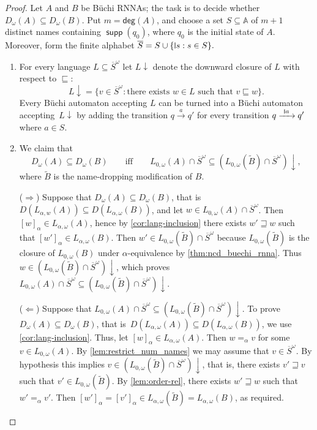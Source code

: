 \documentclass[10pt,a4paper]{amsart}
\newcommand{\midmid}{\hspace{0.2ex}{\rule[-0.1ex]{0.6pt}{1.65ex}}\hspace{0.2ex}}
\newcommand{\scriptmidmid}{\hspace{0.2ex}{\rule[-0.1ex]{0.6pt}{1.1ex}}\hspace{0.2ex}}
\newcommand{\compr}{:}
\newcommand{\newletter}[1]{{\midmid}#1}
\newcommand{\scriptnew}[1]{{\scriptmidmid}#1}
\newcommand{\degree}{\mathsf{deg}}
\numberwithin{equation}{section}
\newcommand{\ol}{\overline}
\newcommand{\xto}[1]{\xrightarrow{~#1~}}
\newcommand{\seq}{\subseteq}
\newcommand{\tl}{\widetilde}
\newcommand{\+}[1]{\mathcal{#1}\xspace}
\newcommand{\names}{\mathbb{A}}
\DeclareMathOperator{\supp}{\mathsf{supp}} %
\theoremstyle{definition}
\begin{document}
%
\begin{proof}
  Let $A$ and $B$ be Büchi RNNAs; the task is to decide whether
  $D_\omega(A)\seq D_\omega(B)$. Put $m=\degree(A)$, and choose a set $S\seq \names$ of $m+1$
  distinct names containing $\supp(q_{0})$, where $q_0$ is the initial state of $A$. Moreover, form the finite
  alphabet
$
    \ol{S}=S\cup \{\newletter s\compr s\in S\}.
$
  \begin{enumerate}
  \item For every language $L\seq \ol{S}^\omega$ let $L{\downarrow}$
    denote the downward closure of $L$ with respect to $\sqsubseteq$:
    \[
      L{\downarrow} = \{ v\in \ol{S}^\omega\compr \text{there exists $w\in
        L$ such that } v\sqsubseteq w \}.
    \]
    Every Büchi automaton accepting $L$ can be turned into a Büchi
    automaton accepting~$L{\downarrow}$ by adding the transition
    $q\xto{a}q'$ for every transition $q\xto{\scriptnew a} q'$ where
    $a\in S$.
    
  \item We claim that
    \begin{equation}\label{eq:acc_equiv_local}
      D_\omega(A)\seq D_\omega(B)
      \qquad\text{iff}\qquad
      L_{0,\omega}(A)\cap \ol{S}^\omega \seq (L_{0,\omega}(\tl{B})\cap
      \ol{S}^\omega){\downarrow},
    \end{equation}
    where $\tl{B}$ is the name-dropping modification of $B$.

    \smallskip\noindent ($\Rightarrow$) Suppose that
    $D_\omega(A)\seq D_\omega(B)$, that is
    $D(L_{\alpha,w}(A))\seq D(L_{\alpha,\omega}(B))$, and let
    $w\in L_{0,\omega}(A)\cap \ol{S}^\omega$. Then
    $[w]_\alpha\in L_{\alpha,\omega}(A)$, hence by
    \autoref{cor:lang-inclusion} there exists $w'\sqsupseteq w$ such
    that $[w']_\alpha\in L_{\alpha,\omega}(B)$. Then
    $w'\in L_{0,\omega}(\tl{B})\cap \ol{S}^\omega$ because
    $L_{0,\omega}(\tl{B})$ is the closure of $L_{0,\omega}(B)$ under
    $\alpha$-equivalence by \autoref{thm:ncd_buechi_rnna}. Thus
    $w\in (L_{0,\omega}(\tl{B})\cap \ol{S}^\omega){\downarrow}$, which
    proves
    $ L_{0,\omega}(A)\cap \ol{S}^\omega \seq (L_{0,\omega}(\tl{B})\cap
    \ol{S}^\omega){\downarrow}$.

    \smallskip\noindent ($\Leftarrow$) Suppose that
    $L_{0,\omega}(A)\cap \ol{S}^\omega \seq (L_{0,\omega}(\tl{B})\cap
    \ol{S}^\omega){\downarrow}$. To prove
    $D_\omega(A)\seq D_\omega(B)$, that
    is~$D(L_{\alpha,\omega}(A))\seq D(L_{\alpha,\omega}(B))$, we use
    \autoref{cor:lang-inclusion}. Thus, let
    $[w]_\alpha \in L_{\alpha,\omega}(A)$. Then $w=_\alpha v$ for some
    $v\in L_{0,\omega}(A)$. By \autoref{lem:restrict_num_names} we may
    assume that $v\in \ol{S}^\omega$.  By hypothesis this implies
    $v\in (L_{0,\omega}(\tl{B})\cap \ol{S}^\omega){\downarrow}$, that
    is, there exists $v'\sqsupseteq v$ such that
    $v'\in L_{0,\omega}(\tl{B})$. By \autoref{lem:order-rel}, there
    exists $w'\sqsupseteq w$ such that $w'=_\alpha v'$. Then
    $[w']_\alpha = [v']_\alpha \in L_{\alpha,\omega}(\tl{B}) = 
    L_{\alpha,\omega}(B)$, as required.


\end{enumerate}
\end{proof}
\end{document}
